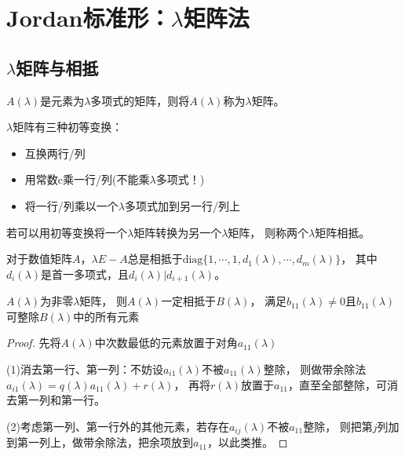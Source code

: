 \section{Jordan标准形：$\lambda$矩阵法}

\subsection{$\lambda$矩阵与相抵}

\begin{definition}[$\lambda$矩阵]
  $A(\lambda)$是元素为$\lambda$多项式的矩阵，则将$A(\lambda)$称为$\lambda$矩阵。
\end{definition}

\begin{definition}
  $\lambda$矩阵有三种初等变换：
  \begin{itemize}
  \item 互换两行/列
  \item 用常数c乘一行/列(不能乘$\lambda$多项式！)
  \item 将一行/列乘以一个$\lambda$多项式加到另一行/列上
  \end{itemize}
\end{definition}

\begin{definition}[相抵]
  若可以用初等变换将一个$\lambda$矩阵转换为另一个$\lambda$矩阵，
  则称两个$\lambda$矩阵相抵。
\end{definition}

\begin{theorem}[相抵标准形：法式]
  对于数值矩阵$A$，$\lambda E - A$总是相抵于$\text{diag}\{1,\cdots,1,d_1(\lambda), \cdots, d_m(\lambda)\}$，
  其中$d_i(\lambda)$是首一多项式，且$d_i(\lambda)|d_{i+1}(\lambda)$。
\end{theorem}

\begin{lemma}[对角整除化]
  $A(\lambda)$为非零$\lambda$矩阵，
  则$A(\lambda)$一定相抵于$B(\lambda)$，
  满足$b_{11}(\lambda) \neq 0$且$b_{11}(\lambda)$可整除$B(\lambda)$中的所有元素
\end{lemma}

\begin{proof}
  先将$A(\lambda)$中次数最低的元素放置于对角$a_{11}(\lambda)$
  
  (1)消去第一行、第一列：不妨设$a_{i1}(\lambda)$不被$a_{11}(\lambda)$整除，
  则做带余除法$a_{i1}(\lambda) = q(\lambda)a_{11}(\lambda) + r(\lambda)$，
  再将$r(\lambda)$放置于$a_{11}$，直至全部整除，可消去第一列和第一行。

  (2)考虑第一列、第一行外的其他元素，若存在$a_{ij}(\lambda)$不被$a_{11}$整除，
  则把第$j$列加到第一列上，做带余除法，把余项放到$a_{11}$，以此类推。
\end{proof}

